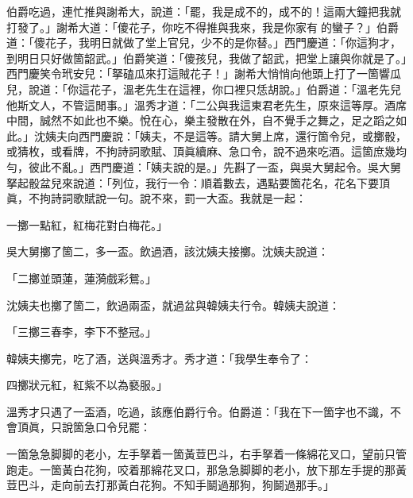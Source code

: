 伯爵吃過，連忙推與謝希大，說道：「罷，我是成不的，成不的！這兩大鐘把我就打發了。」謝希大道：「傻花子，你吃不得推與我來，我是你家有𣬼的蠻子？」伯爵道：「傻花子，我明日就做了堂上官兒，少不的是你替。」西門慶道：「你這狗才，到明日只好做箇韶武。」伯爵笑道：「傻孩兒，我做了韶武，把堂上讓與你就是了。」西門慶笑令玳安兒：「拏磕瓜來打這賊花子！」謝希大悄悄向他頭上打了一箇響瓜兒，說道：「你這花子，溫老先生在這裡，你口裡只恁胡說。」伯爵道：「溫老先兒他斯文人，不管這閒事。」溫秀才道：「二公與我這東君老先生，原來這等厚。酒席中間，誠然不如此也不樂。悅在心，樂主發散在外，自不覺手之舞之，足之蹈之如此。」{}沈姨夫向西門慶說：「姨夫，不是這等。請大舅上席，還行箇令兒，或擲骰，或猜枚，或看牌，不拘詩詞歌賦、頂眞續麻、急口令，說不過來吃酒。這箇庶幾均勻，彼此不亂。」西門慶道：「姨夫說的是。」先斟了一盃，與吳大舅起令。吳大舅拏起骰盆兒來說道：「列位，我行一令：順着數去，遇點要箇花名，花名下要頂眞，不拘詩詞歌賦說一句。說不來，罰一大盃。我就是一起：

\begin{myquote}
一擲一點紅，紅梅花對白梅花。」
\end{myquote}

吳大舅擲了箇二，多一盃。飲過酒，該沈姨夫接擲。沈姨夫說道：

\begin{myquote}
「二擲並頭蓮，蓮漪戲彩鴛。」
\end{myquote}

沈姨夫也擲了箇二，飲過兩盃，就過盆與韓姨夫行令。韓姨夫說道：

\begin{myquote}
「三擲三春李，李下不整冠。」
\end{myquote}

韓姨夫擲完，吃了酒，送與溫秀才。秀才道：「我學生奉令了：

\begin{myquote}
四擲狀元紅，紅紫不以為褻服。」{}
\end{myquote}

溫秀才只遇了一盃酒，吃過，該應伯爵行令。伯爵道：「我在下一箇字也不識，不會頂眞，只說箇急口令兒罷：

\begin{myquote}
一箇急急脚脚的老小，左手拏着一箇黃荳巴斗，右手拏着一條綿花叉口，望前只管跑走。一箇黃白花狗，咬着那綿花叉口，那急急脚脚的老小，放下那左手提的那黃荳巴斗，走向前去打那黃白花狗。不知手鬬過那狗，狗鬬過那手。」
\end{myquote}

